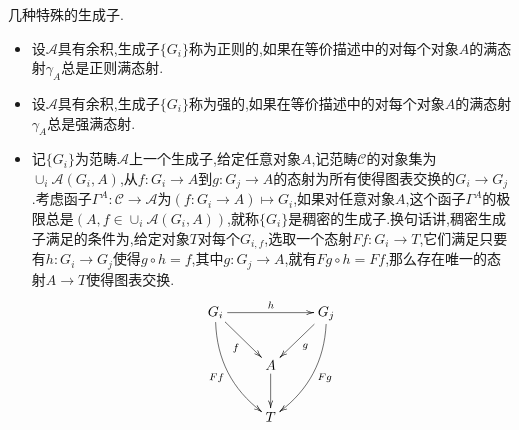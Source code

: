 几种特殊的生成子.
\begin{itemize}
	\item 设$\mathscr{A}$具有余积,生成子$\{G_i\}$称为正则的,如果在等价描述中的对每个对象$A$的满态射$\gamma_A$总是正则满态射.
	\item 设$\mathscr{A}$具有余积,生成子$\{G_i\}$称为强的,如果在等价描述中的对每个对象$A$的满态射$\gamma_A$总是强满态射.
	\item 记$\{G_i\}$为范畴$\mathscr{A}$上一个生成子,给定任意对象$A$,记范畴$\mathscr{C}$的对象集为$\cup_i\mathscr{A}(G_i,A)$,从$f:G_i\to A$到$g:G_j\to A$的态射为所有使得图表交换的$G_i\to G_j$.考虑函子$\Gamma^A:\mathscr{C}\to\mathscr{A}$为$(f:G_i\to A)\mapsto G_i$,如果对任意对象$A$,这个函子$\Gamma^A$的极限总是$(A,f\in\cup_i\mathscr{A}(G_i,A))$,就称$\{G_i\}$是稠密的生成子.换句话讲,稠密生成子满足的条件为,给定对象$T$对每个$G_{i,f}$,选取一个态射$Ff:G_i\to T$,它们满足只要有$h:G_i\to G_j$使得$g\circ h=f$,其中$g:G_j\to A$,就有$Fg\circ h=Ff$,那么存在唯一的态射$A\to T$使得图表交换.
	$$\xymatrix{G_i\ar[dr]_f\ar@/_1pc/[ddr]_{Ff}\ar[rr]^h&&G_j\ar[dl]^g\ar@/^1pc/[ddl]^{Fg}\\&A\ar[d]&\\&T&}$$
\end{itemize}
